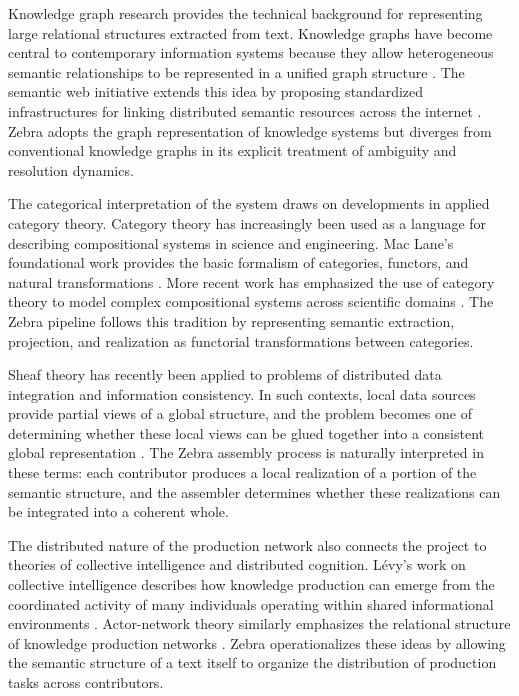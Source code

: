 \documentclass[12pt,a4paper]{article}
\begin{document}
Knowledge graph research provides the technical background for representing large relational structures extracted from text. Knowledge graphs have become central to contemporary information systems because they allow heterogeneous semantic relationships to be represented in a unified graph structure \cite{bizer2009}. The semantic web initiative extends this idea by proposing standardized infrastructures for linking distributed semantic resources across the internet \cite{bernerslee2001}. Zebra adopts the graph representation of knowledge systems but diverges from conventional knowledge graphs in its explicit treatment of ambiguity and resolution dynamics.

The categorical interpretation of the system draws on developments in applied category theory. Category theory has increasingly been used as a language for describing compositional systems in science and engineering. Mac Lane’s foundational work provides the basic formalism of categories, functors, and natural transformations \cite{maclane1998}. More recent work has emphasized the use of category theory to model complex compositional systems across scientific domains \cite{spivak2014,fong2019}. The Zebra pipeline follows this tradition by representing semantic extraction, projection, and realization as functorial transformations between categories.

Sheaf theory has recently been applied to problems of distributed data integration and information consistency. In such contexts, local data sources provide partial views of a global structure, and the problem becomes one of determining whether these local views can be glued together into a consistent global representation \cite{curry2012}. The Zebra assembly process is naturally interpreted in these terms: each contributor produces a local realization of a portion of the semantic structure, and the assembler determines whether these realizations can be integrated into a coherent whole.

The distributed nature of the production network also connects the project to theories of collective intelligence and distributed cognition. Lévy’s work on collective intelligence describes how knowledge production can emerge from the coordinated activity of many individuals operating within shared informational environments \cite{levy2007}. Actor-network theory similarly emphasizes the relational structure of knowledge production networks \cite{latour2005}. Zebra operationalizes these ideas by allowing the semantic structure of a text itself to organize the distribution of production tasks across contributors.
\end{document}
